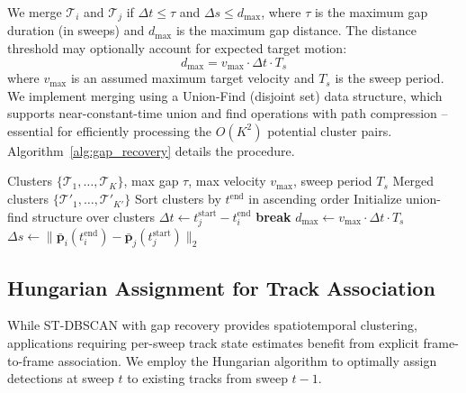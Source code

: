 \documentclass[conf]{new-aiaa}
\begin{document}
We merge $\mathcal{T}_i$ and $\mathcal{T}_j$ if $\Delta t \leq \tau$ and $\Delta s \leq d_{\max}$, where $\tau$ is the maximum gap duration (in sweeps) and $d_{\max}$ is the maximum gap distance. The distance threshold may optionally account for expected target motion:
\begin{equation}
    d_{\max} = v_{\max} \cdot \Delta t \cdot T_s
\end{equation}
where $v_{\max}$ is an assumed maximum target velocity and $T_s$ is the sweep period. We implement merging using a Union-Find (disjoint set) data structure, which supports near-constant-time union and find operations with path compression -- essential for efficiently processing the $O(K^2)$ potential cluster pairs. Algorithm~\ref{alg:gap_recovery} details the procedure.

\begin{algorithm}[t]
\caption{Gap Recovery for Track Continuity}
\label{alg:gap_recovery}
\begin{algorithmic}[1]
\Require Clusters $\{\mathcal{T}_1, \ldots, \mathcal{T}_K\}$, max gap $\tau$, max velocity $v_{\max}$, sweep period $T_s$
\Ensure Merged clusters $\{\mathcal{T}'_1, \ldots, \mathcal{T}'_{K'}\}$
\State Sort clusters by $t^{\text{end}}$ in ascending order
\State Initialize union-find structure over clusters
        \State $\Delta t \gets t_j^{\text{start}} - t_i^{\text{end}}$
            \State \textbf{break} 
        \EndIf
        \State $d_{\max} \gets v_{\max} \cdot \Delta t \cdot T_s$
        \State $\Delta s \gets \| \bar{\mathbf{p}}_i(t_i^{\text{end}}) - \bar{\mathbf{p}}_j(t_j^{\text{start}}) \|_2$
            \State {}
        \EndIf
    \EndFor
\EndFor
\State {}
\end{algorithmic}
\end{algorithm}

\subsection{Hungarian Assignment for Track Association}

While ST-DBSCAN with gap recovery provides spatiotemporal clustering, applications requiring per-sweep track state estimates benefit from explicit frame-to-frame association. We employ the Hungarian algorithm \cite{Kuhn1955} to optimally assign detections at sweep $t$ to existing tracks from sweep $t-1$.
\end{document}
